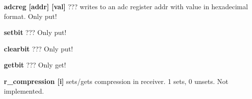 \begin{DoxyItemize}
\item {\bfseries adcreg \mbox{[}addr\mbox{]} \mbox{[}val\mbox{]}} ??? writes to an adc register {\ttfamily addr} with {\ttfamily value} in hexadecimal format. Only put!
\end{DoxyItemize}


\begin{DoxyItemize}
\item {\bfseries setbit} ??? Only put!
\end{DoxyItemize}


\begin{DoxyItemize}
\item {\bfseries clearbit } ??? Only put!
\end{DoxyItemize}


\begin{DoxyItemize}
\item {\bfseries getbit } ??? Only get!
\end{DoxyItemize}


\begin{DoxyItemize}
\item {\bfseries r\_\-compression \mbox{[}i\mbox{]} } sets/gets compression in receiver. 1 sets, 0 unsets. Not implemented. 
\end{DoxyItemize}